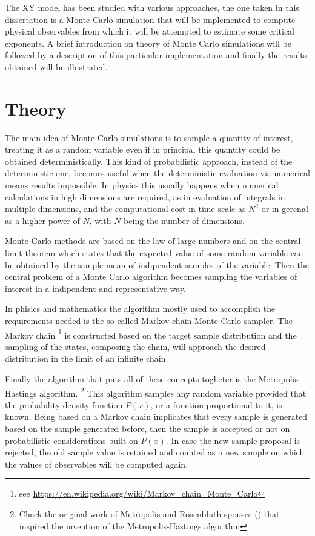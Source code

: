 The XY model has been studied with various approaches, the one taken in this
dissertation is a Monte Carlo simulation that will be implemented to compute
physical observables from which it will be attempted to estimate some critical
exponents. A brief introduction on theory of Monte Carlo simulations will be
followed by a description of this particular implementation and finally the 
results obtained will be illustrated.

\section{Theory}

The main idea of Monte Carlo simulations is to sample a quantity of interest,
treating it as a random variable even if in principal this quantity could be
obtained deterministically. This kind of probabilistic approach, instead of the
deterministic one, becomes useful when the deterministic evaluation via numerical
means results impossible. In physics this usually happens when numerical 
calculations in high dimensions are required, as in evaluation of integrals in 
multiple dimensions, and the computational cost in time scale as $N^2$ or in 
gerenal as a higher power of $N$, with $N$ being the number of dimensions.

Monte Carlo methods are based on the law of large numbers and on the central limit
theorem which states that the expected value of some random variable can be obtained
by the sample mean of indipendent samples of the variable. Then the central problem
of a Monte Carlo algorithm becomes sampling the variables of interest in a
indipendent and representative way.

In phisics and mathematics the algorithm mostly used to accomplish the requirements
needed is the so called Markov chain Monte Carlo sampler. The Markov chain 
\footnote{see \url{https://en.wikipedia.org/wiki/Markov_chain_Monte_Carlo}} is 
constructed based on the target sample distribution and the sampling of the states,
composing the chain, will approach the desired distribution in the limit of an 
infinite chain.

Finally the algorithm that puts all of these concepts togheter is the
Metropolis-Hastings algorithm. \footnote{Check the original work of Metropolis
and Rosenbluth spouses (\cite{Metropolis1953}) that inspired the invention of the
Metropolis-Hastings algorithm} This algorithm samples any random variable
provided that the probability density function $P(x)$, or a function proportional
to it, is known. Being  based on a Markov chain implicates that every sample is generated
based on the sample generated before, then the sample is accepted or not on 
probabilistic considerations built on $P(x)$. In case the new sample proposal
is rejected, the old sample value is retained and counted as a new sample on which
the values of observables will be computed again.

